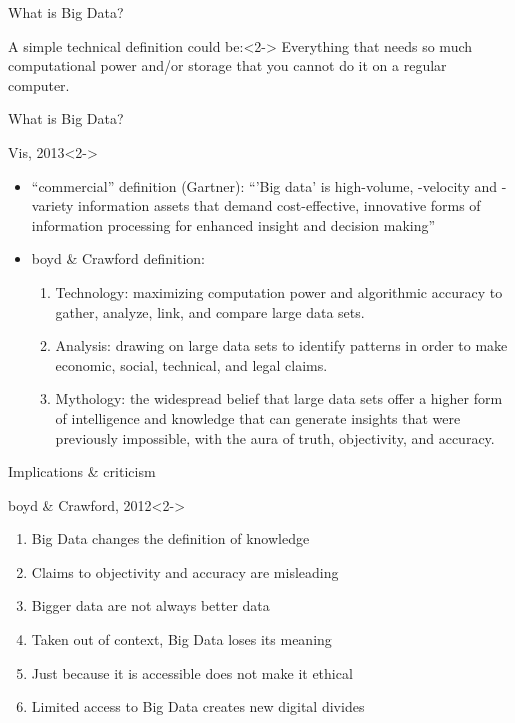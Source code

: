 
\begin{frame}{What is Big Data?}
\begin{block}{A simple technical definition could be:}<2->
Everything that needs so much computational power and/or storage that you cannot do it on a regular computer.
\end{block}
\end{frame}

\begin{frame}{What is Big Data?}
\begin{block}{Vis, 2013}<2->
\begin{itemize}
\item<2,4> ``commercial'' definition (Gartner): ``'Big data' is high-volume, -velocity and -variety information assets that demand cost-effective, innovative forms of information processing for enhanced insight and decision making''
\item<3-> boyd \& Crawford definition: 
\begin{enumerate}
\item Technology: maximizing computation power and algorithmic accuracy to gather, analyze, link, and compare large data sets.
\item Analysis: drawing on large data sets to identify patterns in order to make economic, social, technical, and legal claims.
\item Mythology: the widespread belief that large data sets offer a higher form of intelligence and knowledge that can generate insights that were previously impossible, with the aura of truth, objectivity, and accuracy.
\end{enumerate}
\end{itemize}
\end{block}
\end{frame}


\begin{frame}{Implications \& criticism}
\begin{block}{boyd \& Crawford, 2012}<2->
\begin{enumerate}
\item Big Data changes the definition of knowledge
\item Claims to objectivity and accuracy are misleading
\item Bigger data are not always better data
\item Taken out of context, Big Data loses its meaning
\item Just because it is accessible does not make it ethical
\item Limited access to Big Data creates new digital divides
\end{enumerate}
\end{block}
\end{frame}


